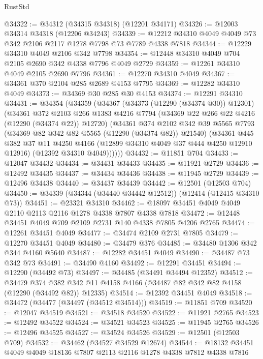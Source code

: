 \begin{lexlean}{RustStd}
\begin{coremodule}
@34322 := @34312 (@34315 @34318) (@12201 @34171)
@34326 := @12003 @34314 @34318 (@12206 @34243)
@34339 := @12212 @34310 @4049 @4049 @73 @342 @2106 @2117 @1278 @7798 @73 @7789 @4338 @7818
@34344 := @12229 @34310 @4049 @2106 @342 @7798
@34354 := @12448 @34310 @4049 @704 @2105 @2690 @342 @4338 @7796 @4049 @2729
@34359 := @12261 @34310 @4049 @2105 @2690 @7796
@34361 := @12270 @34310 @4049
@34367 := @34361 @370 @2104 @285 @2689 @4153 @7795
@34369 := @12282 @34310 @4049
@34373 := @34369 @30 @285 @30 @4153
@34374 := @12291 @34310
@34431 := @34354
    (@34359
      (@34367
        (@34373 (@12290 (@34374 @30)) @12301)
        (@34361
          @372
          @2103
          @266
          @1383
          @4216
          @7794
          (@34369 @22 @266 @22 @4216 (@12290 (@34374 @22)) @12720)
          (@34361
            @374
            @2102
            @342
            @39
            @5565
            @7793
            (@34369 @82 @342 @82 @5565 (@12290 (@34374 @82)) @21540)
            (@34361
              @445
              @382
              @37
              @11
              @4250
              @4166
              (@12899 @34310 @4049 @37 @444 @4250 @12910 @12916)
              (@12392 @34310 @4049))))))
@34432 := @11851 @704
@34433 := @12047 @34432
@34434 := @34431 @34433
@34435 := @11921 @2729
@34436 := @12492 @34435
@34437 := @34434 @34436
@34438 := @11945 @2729
@34439 := @12496 @34438
@34440 := @34437 @34439
@34442 := @12501 (@12503 @704)
@34450 := @34339 (@34344 (@34440 @34442 @12512)) (@12414 (@12415 @34310 @73))
@34451 := @23321 @34310
@34462 := @18097 @34451 @4049 @4049 @2110 @2113 @2116 @1278 @4338 @7807 @4338 @7818
@34472 := @12448 @34451 @4049 @709 @2109 @2731 @140 @4338 @7805 @4206 @2765
@34474 := @12261 @34451 @4049
@34477 := @34474 @2109 @2731 @7805
@34479 := @12270 @34451 @4049
@34480 := @34479 @376
@34485 := @34480 @1306 @342 @344 @4160 @5640
@34487 := @12282 @34451 @4049
@34490 := @34487 @73 @342 @73
@34491 := @34490 @4160
@34492 := @12291 @34451
@34494 := @12290 (@34492 @73)
@34497 := @34485 (@34491 @34494 @12352)
@34512 := @34479
    @374
    @382
    @342
    @11
    @4158
    @4166
    (@34487 @82 @342 @82 @4158 (@12290 (@34492 @82)) @12335)
@34514 := @12392 @34451 @4049
@34518 := @34472 (@34477 (@34497 (@34512 @34514)))
@34519 := @11851 @709
@34520 := @12047 @34519
@34521 := @34518 @34520
@34522 := @11921 @2765
@34523 := @12492 @34522
@34524 := @34521 @34523
@34525 := @11945 @2765
@34526 := @12496 @34525
@34527 := @34524 @34526
@34529 := @12501 (@12503 @709)
@34532 := @34462 (@34527 @34529 @12674)
@34544 := @18132 @34451 @4049 @4049 @18136 @7807 @2113 @2116 @1278 @4338 @7812 @4338 @7816

\end{coremodule}
\end{lexlean}

